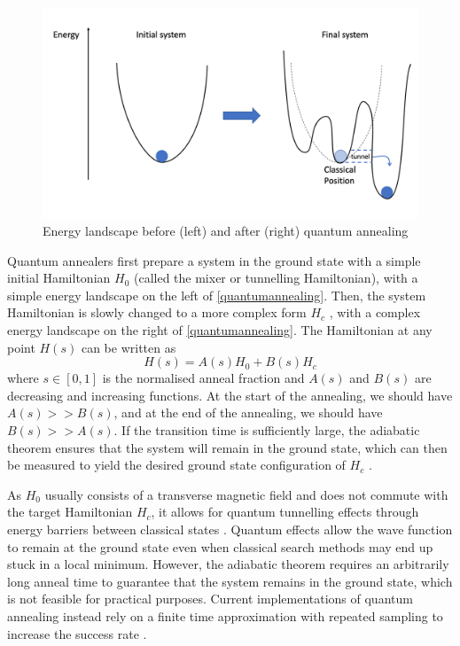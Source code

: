 \begin{figure}[htb!]
    \centering
    \includegraphics[width=0.8\linewidth]{images/quantum_annealing.png}
    \caption{Energy landscape before (left) and after (right) quantum annealing}
    \label{quantumannealing}
\end{figure}
Quantum annealers first prepare a system in the ground state with a simple initial Hamiltonian $H_0$ (called the mixer or tunnelling Hamiltonian), with a simple energy landscape on the left of \autoref{quantumannealing}. Then, the system Hamiltonian is slowly changed to a more complex form $H_c$ \cite{b10}, with a complex energy landscape on the right of \autoref{quantumannealing}. The Hamiltonian at any point $H(s)$ can be written as
\begin{equation}
    \label{eqn:annealinghamiltonian}
    H(s) = A(s)H_0 + B(s)H_c
\end{equation}
where $s \in [0,1]$ is the normalised anneal fraction and $A(s)$ and $B(s)$ are decreasing and increasing functions. At the start of the annealing, we should have $A(s) >> B(s)$, and at the end of the annealing, we should have $B(s) >> A(s)$. If the transition time is sufficiently large, the adiabatic theorem ensures that the system will remain in the ground state, which can then be measured to yield the desired ground state configuration of $H_c$ \cite{b14}. 

As $H_0$ usually consists of a transverse magnetic field and does not commute with the target Hamiltonian $H_c$, it allows for quantum tunnelling effects through energy barriers between classical states \cite{kadowaki1998quantum}. Quantum effects allow the wave function to remain at the ground state even when classical search methods may end up stuck in a local minimum. However, the adiabatic theorem requires an arbitrarily long anneal time to guarantee that the system remains in the ground state, which is not feasible for practical purposes. Current implementations of quantum annealing instead rely on a finite time approximation with repeated sampling to increase the success rate \cite{farhi2001}.

